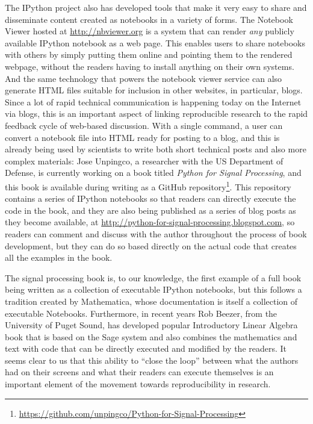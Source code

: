 \documentclass[ChapterTOCs,krantz2]{krantz} %
\begin{document}
The IPython project also has developed tools that make it very easy to share
and disseminate content created as notebooks in a variety of forms.  The
Notebook Viewer hosted at \url{http://nbviewer.org} is a system that can render
\emph{any} publicly available IPython notebook as a web page.  This enables
users to share notebooks with others by simply putting them online and
pointing them to the rendered webpage, without the readers having to install
anything on their own systems.  And the same technology that powers the
notebook viewer service can also generate HTML files suitable for inclusion in
other websites, in particular, blogs.  Since a lot of rapid technical
communication is happening today on the Internet via blogs, this is an
important aspect of linking reproducible research to the rapid feedback cycle
of web-based discussion.  With a single command, a user can convert a notebook
file into HTML ready for posting to a blog, and this is already being used by
scientists to write both short technical posts and also more complex
materials: Jose Unpingco, a researcher with the US Department of Defense, is
currently working on a book titled \emph{Python for Signal Processing}, and
this book is available during writing as a GitHub
repository\footnote{\url{https://github.com/unpingco/Python-for-Signal-Processing}}.
This repository contains a series of IPython notebooks so that readers can
directly execute the code in the book, and they are also being published as a
series of blog posts as they become available, at
\url{http://python-for-signal-processing.blogspot.com}, so readers can comment
and discuss with the author throughout the process of book development, but
they can do so based directly on the actual code that creates all the examples
in the book.

The signal processing book is, to our knowledge, the first example of a full
book being written as a collection of executable IPython notebooks, but this
follows a tradition created by Mathematica, whose documentation is itself a
collection of executable Notebooks.  Furthermore, in recent years Rob Beezer,
from the University of Puget Sound, has developed popular Introductory Linear
Algebra book \cite{beezer2009first} that is based on the Sage system and
also combines the mathematics and text with code that can be directly executed
and modified by the readers.  It seems clear to us that this ability to ``close
the loop'' between what the authors had on their screens and what their readers
can execute themselves is an important element of the movement towards
reproducibility in research.
\end{document}
